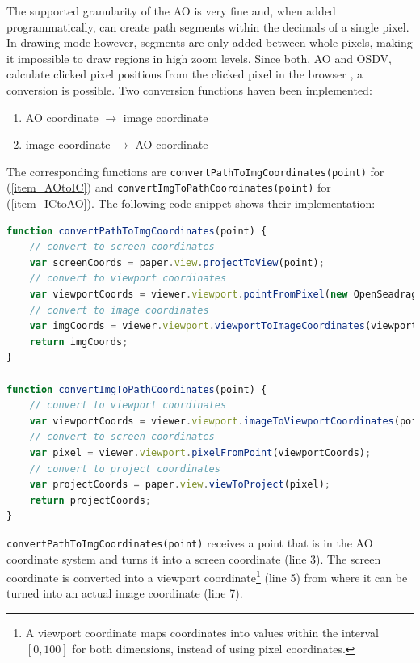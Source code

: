 The supported granularity of the AO is very fine and, when added programmatically, can create path segments within the decimals of a single pixel\cite{web:paper}. In drawing mode however, segments are only added between whole pixels, making it impossible to draw regions in high zoom levels. Since both, AO and OSDV, calculate clicked pixel positions from the clicked pixel in the browser \cite{web:openseadragon,web:paper}, a conversion is possible. Two conversion functions haven been implemented:
\begin{enumerate}[(1)]
	\item\label{item_AOtoIC} AO coordinate $\rightarrow$ image coordinate
	\item\label{item_ICtoAO} image coordinate $\rightarrow$ AO coordinate
\end{enumerate}

The corresponding functions are \texttt{convertPathToImgCoordinates(point)} for (\ref{item_AOtoIC}) and \texttt{convertImgToPathCoordinates(point)} for (\ref{item_ICtoAO}). The following code snippet shows their implementation:\clearpage

\begin{lstlisting}[title=as{\textunderscore}viewer.js, frame=single, language=JavaScript]
function convertPathToImgCoordinates(point) {
	// convert to screen coordinates
	var screenCoords = paper.view.projectToView(point);
	// convert to viewport coordinates
	var viewportCoords = viewer.viewport.pointFromPixel(new OpenSeadragon.Point(screenCoords.x, screenCoords.y));
	// convert to image coordinates
	var imgCoords = viewer.viewport.viewportToImageCoordinates(viewportCoords);
	return imgCoords;
}

function convertImgToPathCoordinates(point) {
	// convert to viewport coordinates
	var viewportCoords = viewer.viewport.imageToViewportCoordinates(point);
	// convert to screen coordinates
	var pixel = viewer.viewport.pixelFromPoint(viewportCoords);
	// convert to project coordinates
	var projectCoords = paper.view.viewToProject(pixel);
	return projectCoords;
}
\end{lstlisting}

\texttt{convertPathToImgCoordinates(point)} receives a point that is in the AO coordinate system and turns it into a screen coordinate (line 3). The screen coordinate is converted into a viewport coordinate\footnote{
	A viewport coordinate maps coordinates into values within the interval $[0, 100]$ for both dimensions, instead of using pixel coordinates\cite{web:openseadragon}.
} (line 5) from where it can be turned into an actual image coordinate (line 7).

